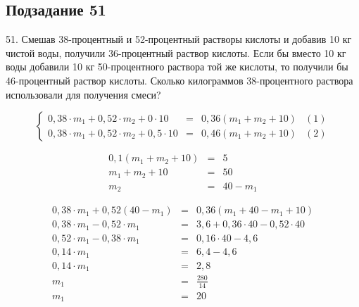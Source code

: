 \subsection*{Подзадание 51}

51. Смешав 38-процентный и 52-процентный растворы кислоты и добавив 10 кг чистой воды, получили 36-процентный раствор кислоты. Если бы вместо 10 кг воды добавили 10 кг 50-процентного раствора той же кислоты, то получили бы 46-процентный раствор кислоты. Сколько килограммов 38-процентного раствора использовали для получения смеси?

\begin{equation*}
    \left\{
    \begin{array}{lclr}
        0,38 \cdot m_1 + 0,52 \cdot m_2 + 0 \cdot 10   & = & 0,36 (m_1 + m_2 + 10) & (1) \\
        0,38 \cdot m_1 + 0,52 \cdot m_2 + 0,5 \cdot 10 & = & 0,46 (m_1 + m_2 + 10) & (2)
    \end{array}
    \right.
\end{equation*}

\begin{equation*}
    \begin{array}{rcl}
        0,1(m_1 + m_2 + 10) & = & 5        \\
        m_1 + m_2 + 10      & = & 50       \\
        m_2                 & = & 40 - m_1
    \end{array}
\end{equation*}

\begin{equation*}
    \begin{array}{rcl}
        0,38 \cdot m_1 + 0,52(40 - m_1) & = & 0,36(m _1 + 40 - m_1 + 10)           \\
        0,38 \cdot m_1 - 0,52 \cdot m_1 & = & 3,6 + 0,36 \cdot 40  - 0,52 \cdot 40 \\
        0,52 \cdot m_1 - 0,38 \cdot m_1 & = & 0,16 \cdot 40 - 4,6                  \\
        0,14 \cdot m_1                  & = & 6,4 - 4,6                            \\
        0,14 \cdot m_1                  & = & 2,8                                  \\
        m_1                             & = & \frac{280}{14}                       \\
        m_1                             & = & 20                                   \\
    \end{array}
\end{equation*}

